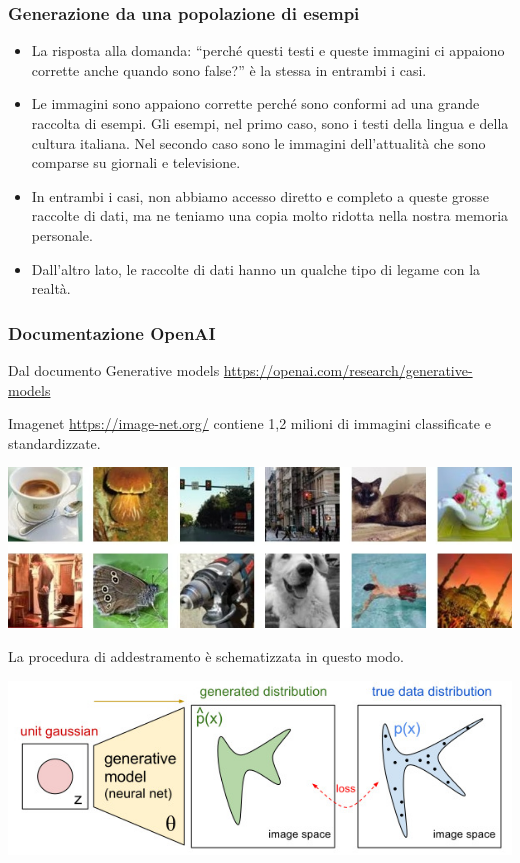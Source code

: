\documentclass[xcolor=svgnames]{beamer}
\begin{document}
\begin{frame}[plain]\small\frametitle{Generazione da una popolazione di esempi}

\begin{itemize}
\item La risposta alla domanda: ``perché questi testi e queste immagini ci appaiono corrette anche quando sono false?'' è la stessa in entrambi i casi.
\item
Le immagini sono appaiono corrette perché sono conformi ad una grande raccolta di esempi. Gli esempi, nel primo caso, sono i testi della lingua e della cultura italiana. Nel secondo caso sono le immagini dell'attualità che sono comparse su giornali e televisione.
\item
In entrambi i casi, non abbiamo accesso diretto e completo a queste grosse raccolte di dati, ma ne teniamo una copia molto ridotta nella nostra memoria personale.
\item
Dall'altro lato, le raccolte di dati hanno un qualche tipo di legame con la realtà.
    
\end{itemize}

\end{frame}

\begin{frame}[plain]\small\frametitle{Documentazione OpenAI}
{\tiny Dal documento Generative models \url{https://openai.com/research/generative-models}}

Imagenet \url{https://image-net.org/} contiene 1,2 milioni di immagini classificate e standardizzate.

\includegraphics[width=\textwidth]{pictures/gen_models_img_1.jpg}

La procedura di addestramento è schematizzata in questo modo.

\includegraphics[width=\textwidth]{pictures/gen_models_diag_2.jpg}
\end{frame}
\end{document}
